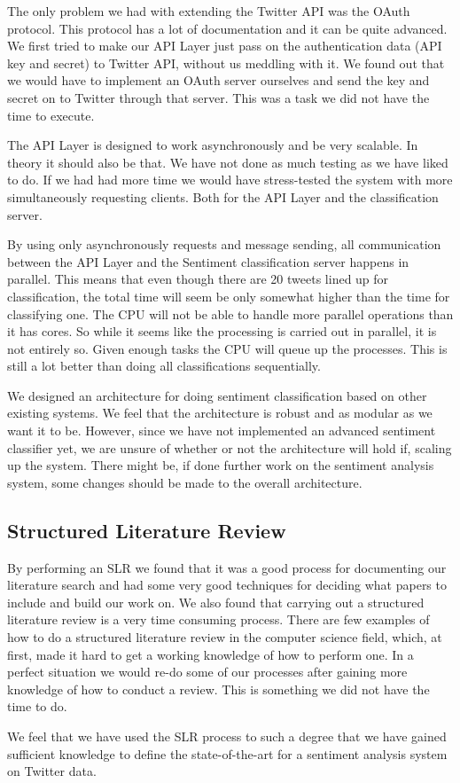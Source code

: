 The only problem we had with extending the Twitter API was the OAuth protocol. This protocol has a lot of documentation and it can be quite advanced. We first tried to make our API Layer just pass on the authentication data (API key and secret) to Twitter API, without us meddling with it. We found out that we would have to implement an OAuth server ourselves and send the key and secret on to Twitter through that server. This was a task we did not have the time to execute. 

The API Layer is designed to work asynchronously and be very scalable. In theory it should also be that. We have not done as much testing as we have liked to do. If we had had more time we would have stress-tested the system with more simultaneously requesting clients. Both for the API Layer and the classification server. 

By using only asynchronously requests and message sending, all communication between the API Layer and the Sentiment classification server happens in parallel. This means that even though there are 20 tweets lined up for classification, the total time will seem be only somewhat higher than the time for classifying one. The CPU will not be able to handle more parallel operations than it has cores. So while it seems like the processing is carried out in parallel, it is not entirely so. Given enough tasks the CPU will queue up the processes. This is still a lot better than doing all classifications sequentially. 

We designed an architecture for doing sentiment classification based on other existing systems. We feel that the architecture is robust and as modular as we want it to be. However, since we have not implemented an advanced sentiment classifier yet, we are unsure of whether or not the architecture will hold if, scaling up the system. There might be, if done further work on the sentiment analysis system, some changes should be made to the overall architecture. 


\subsection{Structured Literature Review}

By performing an SLR we found that it was a good process for documenting our literature search and had some very good techniques for deciding what papers to include and build our work on. We also found that carrying out a structured literature review is a very time consuming process. There are few examples of how to do a structured literature review in the computer science field, which, at first, made it hard to get a working knowledge of how to perform one. In a perfect situation we would re-do some of our processes after gaining more knowledge of how to conduct a review. This is something we did not have the time to do. 

We feel that we have used the SLR process to such a degree that we have gained sufficient knowledge to define the state-of-the-art for a sentiment analysis system on Twitter data. 